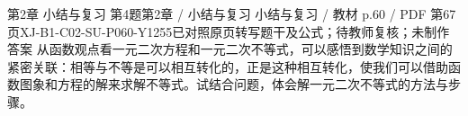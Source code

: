 \par\noindent\begin{minipage}{\linewidth}
\begin{bankitem}{第2章 小结与复习 第4题}{第2章 / 小结与复习 小结与复习 / 教材 p.60 / PDF 第67页}{XJ-B1-C02-SU-P060-Y1255}{已对照原页转写题干及公式；待教师复核；未制作答案}
从函数观点看一元二次方程和一元二次不等式，可以感悟到数学知识之间的紧密关联：相等与不等是可以相互转化的，正是这种相互转化，使我们可以借助函数图象和方程的解来求解不等式。试结合问题，体会解一元二次不等式的方法与步骤。
\end{bankitem}
\end{minipage}\par\medskip
